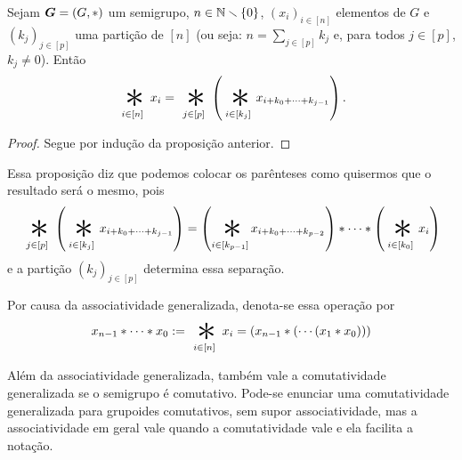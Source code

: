 \begin{proposition}
Sejam $\bm G=(G,\ast)$ um semigrupo, $n \in \mathbb{N} \smallsetminus \{0\}$, $(x_i)_{i \in [n]}$ elementos de $G$ e $(k_j)_{j \in [p]}$ uma partição de $[n]$ (ou seja: $n = \sum_{j \in [p]} k_j$ e, para todos $j \in [p]$, $k_j \neq 0$). Então
	\begin{equation*}
	\bigopb_{i \in [n]} x_i = \bigopb_{j \in [p]}\left(\bigopb_{i \in [k_j]} x_{i + k_0 + \cdots + k_{j-1}}\right).
	\end{equation*}
\end{proposition}
\begin{proof}
Segue por indução da proposição anterior.
\end{proof}

Essa proposição diz que podemos colocar os parênteses como quisermos que o resultado será o mesmo, pois
	\begin{equation*}
	\bigopb_{j \in [p]}\left(\bigopb_{i \in [k_j]} x_{i + k_0 + \cdots + k_{j-1}}\right) = \left(\bigopb_{i \in [k_{p-1}]} x_{i + k_0 + \cdots + k_{p-2}}\right) \opb \cdots \opb \left(\bigopb_{i \in [k_0]} x_i\right)
	\end{equation*}
e a partição $(k_j)_{j \in [p]}$ determina essa separação.

\begin{notation}
Por causa da associatividade generalizada, denota-se essa operação por
	\begin{equation*}
	x_{n-1} \opb \cdots \opb x_0 := \bigopb_{i \in [n]} x_i = (x_{n-1} \opb ( \cdots (x_1 \opb x_0)))
	\end{equation*}
\end{notation}

Além da associatividade generalizada, também vale a comutatividade generalizada se o semigrupo é comutativo. Pode-se enunciar uma comutatividade generalizada para grupoides comutativos, sem supor associatividade, mas a associatividade em geral vale quando a comutatividade vale e ela facilita a notação.

